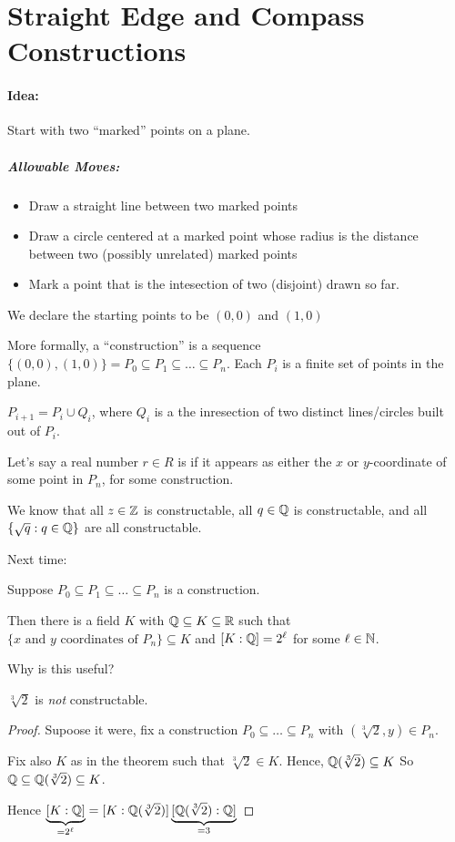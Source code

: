 \documentclass[notes.tex]{subfiles}
\begin{document}
\section*{Straight Edge and Compass Constructions}

\paragraph{Idea:}Start with two ``marked'' points on a plane. 
\subparagraph{Allowable Moves:} \leavevmode
	\begin{itemize}
		\item Draw a straight line between two marked points
		\item Draw a circle centered at a marked point whose radius is the distance between two (possibly unrelated) marked points
		\item Mark a point that is the intesection of two (disjoint) drawn so far.
	\end{itemize}

We declare the starting points to be $(0, 0)$ and $(1, 0)$


More formally, a ``construction'' is a sequence $\{(0, 0), (1, 0)\} = P_0\subseteq P_1\subseteq \ldots \subseteq P_n$. Each $P_i$ is a finite set of points in the plane.

$P_{i+1} = P_i \cup Q_i$, where $Q_i$ is a the inresection of two distinct lines/circles built out of $P_i$.

Let's say a real number $r\in R$ is  if it appears as either the $x$ or $y$-coordinate of some point in $P_n$, for some construction.

We know that all $z\in\mathbb{Z}$ is constructable, all $q\in\mathbb{Q}$ is constructable, and all
$\{\sqrt{q} : q\in \mathbb{Q}\}$ are all constructable.

Next time: 

\begin{theorem}
	\label{thm:non-constructable}
	Suppose $P_0\subseteq P_1\subseteq \ldots\subseteq P_n$ is a construction.

	Then there is a field $K$ with $\mathbb{Q}\subseteq K\subseteq \mathbb{R}$ such that
	$\{x\text{ and }y\text{ coordinates of } P_n\}\subseteq K$ and $[K:\mathbb{Q}]= 2^\ell$ for some $\ell\in\mathbb{N}$.
\end{theorem}

Why is this useful?
\begin{proposition}
	$\sqrt[3]{2}$ is \emph{not} constructable.
\end{proposition}
\begin{proof}
	Supoose it were, fix a construction $P_0 \subseteq \ldots\subseteq P_n$ with $(\sqrt[3]{2}, y)\in P_n$.

	Fix also $K$ as in the theorem such that $\sqrt[3]{2}\in K$. Hence, $\mathbb{Q}(\sqrt[3]{2})\subseteq K$
	So $\mathbb{Q}\subseteq \mathbb{Q}(\sqrt[3]{2})\subseteq K$.

	Hence $\underbrace{[K:\mathbb{Q}]}_{=2^\ell} = [K:\mathbb{Q}(\sqrt[3]{2})]\underbrace{[\mathbb{Q}(\sqrt[3]{2}) : \mathbb{Q}]}_{=3}$
\end{proof}
\end{document}
